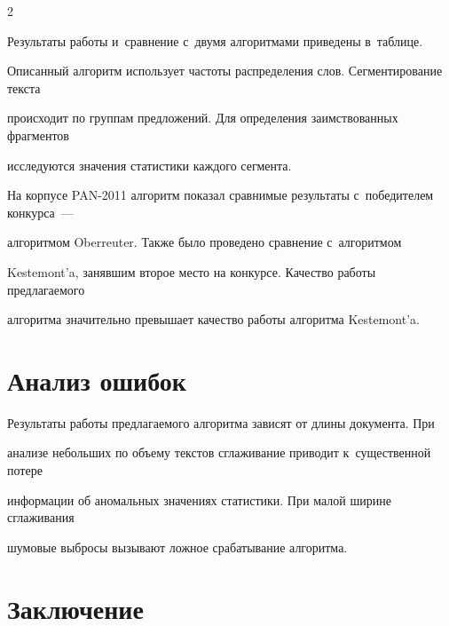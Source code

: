 \begin{multicols}{2}












Результаты работы и~сравнение с~двумя алгоритмами приведены в~таблице.







Описанный алгоритм использует частоты распределения слов. Сегментирование текста 

происходит по группам предложений. Для определения заимствованных фрагментов 

исследуются значения статистики каждого сегмента.



На корпусе PAN-2011 алгоритм показал сравнимые результаты с~победителем конкурса~--- 

алгоритмом Oberreuter. Также было проведено сравнение с~алгоритмом 

Kestemont'a, занявшим второе место на конкурсе. Качество работы предлагаемого 

алгоритма значительно превышает качество работы алгоритма Kestemont'a.





\section{Анализ ошибок}



Результаты работы предлагаемого алгоритма зави\-сят от длины документа. При 

анализе небольших по объему текстов сглаживание приводит к~существенной потере 

информации об аномальных значениях статистики. При малой ширине сглаживания 

шумовые выбросы вызывают ложное срабатывание алгоритма.



\vspace*{-14pt}



\section{Заключение}




\end{multicols}

